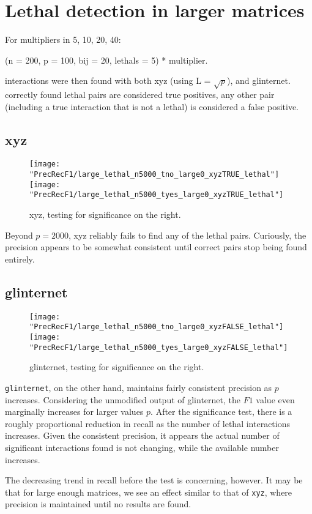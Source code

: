 \documentclass{article}
\begin{document}
\section{Lethal detection in larger matrices}
For multipliers in 5, 10, 20, 40:

(n = 200, p = 100, bij = 20, lethals = 5) * multiplier.

interactions were then found with both xyz (using L = $\sqrt{p}$), and glinternet. correctly found lethal pairs are considered true positives, any other pair (including a true interaction that is not a lethal) is considered a false positive.
\subsection{xyz}
\begin{figure}[H]
\begin{minipage}{\linewidth}
	\centering
	\texttt{[image: "PrecRecF1/large\_lethal\_n5000\_tno\_large0\_xyzTRUE\_lethal"]}%
	\texttt{[image: "PrecRecF1/large\_lethal\_n5000\_tyes\_large0\_xyzTRUE\_lethal"]}
\end{minipage}
\caption{xyz, testing for significance on the right.}
\end{figure}

Beyond $p = 2000$, xyz reliably fails to find any of the lethal pairs. Curiously, the precision appears to be somewhat consistent until correct pairs stop being found entirely.

\subsection{glinternet}
\begin{figure}[H]
\begin{minipage}{\linewidth}
	\centering
	\texttt{[image: "PrecRecF1/large\_lethal\_n5000\_tno\_large0\_xyzFALSE\_lethal"]}%
	\texttt{[image: "PrecRecF1/large\_lethal\_n5000\_tyes\_large0\_xyzFALSE\_lethal"]}
\end{minipage}
\caption{glinternet, testing for significance on the right.}
\end{figure}
\verb|glinternet|, on the other hand, maintains fairly consistent precision as $p$ increases. Considering the unmodified output of glinternet, the $F1$ value even marginally increases for larger values $p$. After the significance test, there is a roughly proportional reduction in recall as the number of lethal interactions increases. Given the consistent precision, it appears the actual number of significant interactions found is not changing, while the available number increases.

The decreasing trend in recall before the test is concerning, however. It may be that for large enough matrices, we see an effect similar to that of \verb|xyz|, where precision is maintained until no results are found.
\end{document}
